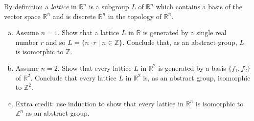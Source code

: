 \documentclass{article}
\newcounter{Problem}
\newenvironment{Problem}{\begin{Exercise}[name={Problem},
                                          counter={Problem}]}
                        {\end{Exercise}}
\begin{document}
\begin{Answer}
\begin{enumerate}[(a)]
{%
  }
\end{enumerate}
\end{Answer}

\pagebreak

\begin{Problem}
By definition a \emph{lattice} in $\mathbb{R}^n$ is a subgroup $L$ of
$\mathbb{R}^n$ which contains a basis of the vector space
$\mathbb{R}^n$ and is discrete
$\mathbb{R}^n$ in the topology of $\mathbb{R}^n$.
\begin{enumerate}[(a)]
  \item{
    Assume $n = 1$. Show that a lattice $L$ in $\mathbb{R}$ is
    generated by a single real number $r$ and so
    $L = \{ n \cdot r \mid n \in \mathbb{Z} \}$. Conclude that, as an
    abstract group, $L$ is isomorphic to $\mathbb{Z}$.
  }
  \item{
    Assume $n = 2$. Show that every lattice $L$ in $\mathbb{R}^2$ is
    generated by a basis $\{f_1, f_2\}$ of $\mathbb{R}^2$. Conclude
    that every lattice $L$ in $\mathbb{R}^2$ is, as an abstract group,
    isomorphic to $\mathbb{Z}^2$.
  }
  \item{
    Extra credit: use induction to show that every lattice in
    $\mathbb{R}^n$ is isomorphic to $\mathbb{Z}^n$ as an abstract group.
  }
\end{enumerate}
\end{Problem}
\end{document}
